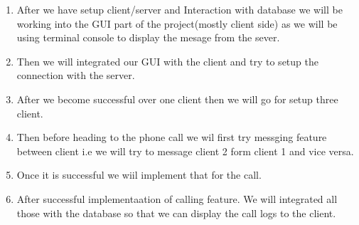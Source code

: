 \documentclass[a4paper]{article}
\begin{document}
{{{\begin{enumerate}
				\item After we have setup client/server and Interaction with database we will be working into the GUI part of the project(mostly client side)  as we will be using terminal console to display the mesage from the sever.


				\item Then we will integrated our GUI with the client and try to setup the connection with the server.
				\item After we become successful over one client then we will go for setup three client.

				\item Then before heading to the phone call we wil first try messging feature between client i.e we will try to message client 2 form client 1 and vice versa.

				\item Once it is successful we wiil implement that for the call.

				\item After successful implementaation of calling feature. We will integrated all those with the database so that we can display the call logs to the client.
			\end{enumerate}
		}

	}
}
\end{document}
